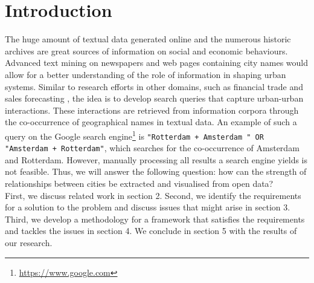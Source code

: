 \newpage
\section{Introduction}


The huge amount of textual data generated online and the numerous historic archives are great sources of information on social and economic behaviours. Advanced text mining on newspapers and web pages containing city names would allow for a better understanding of the role of information in shaping urban systems. Similar to research efforts in other domains, such as financial trade \cite{preis2013quantifying} and sales forecasting \cite{wu2014future}, the idea is to develop search queries that capture urban-urban interactions. These interactions are retrieved from information corpora through the co-occurrence of geographical names in textual data. An example of such a query on the Google search engine\footnote{\url{https://www.google.com}} is \texttt{"Rotterdam + Amsterdam " OR "Amsterdam + Rotterdam"}, which searches for the co-occurrence of Amsterdam and Rotterdam. However, manually processing all results a search engine yields is not feasible. Thus, we will answer the following question: 
how can the strength of relationships between cities be extracted and visualised from open data? \\

First, we discuss related work in section 2. Second, we identify the requirements for a solution to the problem and discuss issues that might arise in section 3. Third, we develop a methodology for a framework that satisfies the requirements and tackles the issues in section 4. We conclude in section 5 with the results of our research.